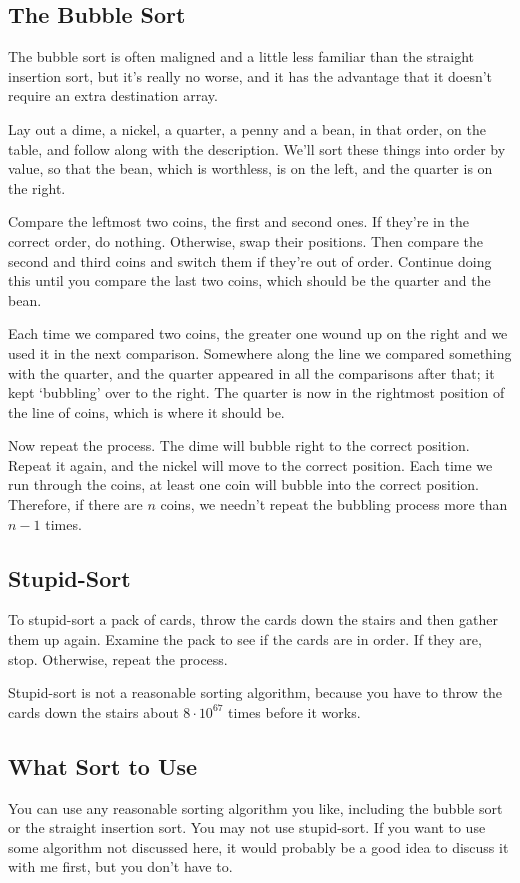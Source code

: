\subsection{The Bubble Sort}

The bubble sort is often maligned and a little less familiar than the
straight insertion sort, but it's really no worse, and it has the
advantage that it doesn't require an extra destination array.

Lay out a dime, a nickel, a quarter, a penny and a bean, in that order,
on the table, and follow along with the description.  We'll sort these
things into order by value, so that the bean, which is worthless, is on
the left, and the quarter is on the right.

Compare the leftmost two coins, the first and second ones.  If they're
in the correct order, do nothing.  Otherwise, swap their positions.
Then compare the second and third coins and switch them if they're out
of order.  Continue doing this until you compare the last two coins,
which should be the quarter and the bean.

Each time we compared two coins, the greater one wound up on the right
and we used it in the next comparison. Somewhere along the line we
compared something with the quarter, and the quarter appeared in all the
comparisons after that; it kept `bubbling' over to the right.  The
quarter is now in the rightmost position of the line of coins, which is
where it should be.

Now repeat the process.  The dime will bubble right to the correct
position. Repeat it again, and the nickel will move to the correct
position.  Each time we run through the coins, at least one coin will
bubble into the correct position.  Therefore, if there are $n$ coins, we
needn't repeat the bubbling process more than $n-1$ times. 

\subsection{Stupid-Sort}

To stupid-sort a pack of cards, throw the cards down the stairs and then
gather them up again.  Examine the pack to see if the cards are in
order.  If they are, stop.  Otherwise, repeat the process. 

Stupid-sort is not a reasonable sorting algorithm, because you have to
throw the cards down the stairs about $8\cdot10^{67}$ 
times before it works.

\subsection{What Sort to Use}

You can use any reasonable sorting algorithm you like, including the
bubble sort or the straight insertion sort.  You may not use
stupid-sort.  If you want to use some algorithm not discussed here, it
would probably be a good idea to discuss it with me first, but you don't
have to.




